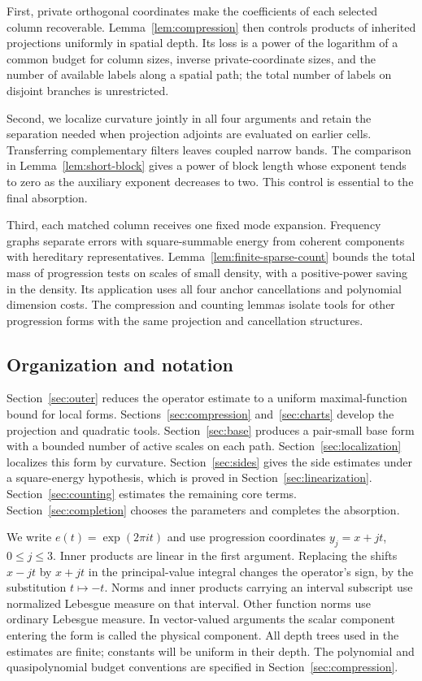 First, private orthogonal coordinates make the coefficients of each
selected column recoverable.  Lemma~\ref{lem:compression} then controls
products of inherited projections uniformly in spatial depth.  Its loss
is a power of the logarithm of a common budget for column sizes, inverse
private-coordinate sizes, and the number of available labels along a
spatial path; the total number of labels on disjoint branches is unrestricted.

Second, we localize curvature jointly in all four arguments and retain
the separation needed when projection adjoints are evaluated on earlier
cells.  Transferring complementary filters leaves coupled narrow
bands.  The comparison in Lemma~\ref{lem:short-block} gives a
power of block length whose exponent tends to zero as the auxiliary
exponent decreases to two.  This control is essential to the final
absorption.

Third, each matched column receives one fixed mode expansion.
Frequency graphs separate errors with square-summable energy from
coherent components with hereditary representatives.
Lemma~\ref{lem:finite-sparse-count} bounds the total mass of progression
tests on scales of small density, with a positive-power saving in the
density.  Its application uses all four anchor cancellations and
polynomial dimension costs.  The compression and counting lemmas isolate
tools for other progression forms with the same projection and
cancellation structures.

\subsection*{Organization and notation}
Section~\ref{sec:outer} reduces the operator estimate to a uniform
maximal-function bound for local forms.  Sections~\ref{sec:compression}
and~\ref{sec:charts} develop the projection and quadratic tools.
Section~\ref{sec:base} produces a pair-small base form with a bounded
number of active scales on each path.  Section~\ref{sec:localization}
localizes this form by curvature.  Section~\ref{sec:sides} gives the side
estimates under a square-energy hypothesis, which is proved in
Section~\ref{sec:linearization}.  Section~\ref{sec:counting} estimates the
remaining core terms.  Section~\ref{sec:completion} chooses the parameters
and completes the absorption.

We write $e(t)=\exp(2\pi i t)$ and use progression coordinates
$y_j=x+jt$, $0\le j\le3$.
Inner products are linear in the first argument.  Replacing the shifts
$x-jt$ by $x+jt$ in the principal-value integral changes the operator's
sign, by the substitution $t\mapsto-t$.
Norms and inner products carrying an interval
subscript use normalized Lebesgue measure on that interval.  Other
function norms use ordinary Lebesgue measure.  In vector-valued
arguments the scalar component entering the form is called the physical
component.  All depth trees used in the estimates are finite; constants
will be uniform in their depth.  The polynomial and quasipolynomial
budget conventions are specified in Section~\ref{sec:compression}.
